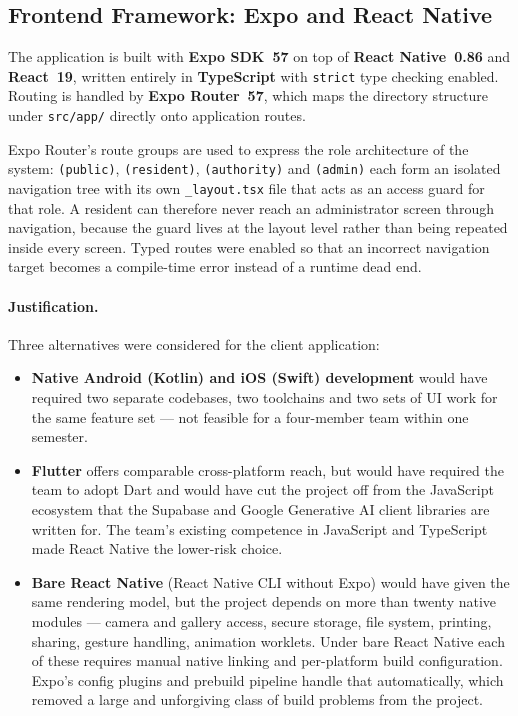 \documentclass[11pt,a4paper]{article}
\newcommand{\code}[1]{\texttt{\small #1}}
\begin{document}
\subsection{Frontend Framework: Expo and React Native}

The application is built with \textbf{Expo SDK~57} on top of
\textbf{React Native~0.86} and \textbf{React~19}, written entirely in
\textbf{TypeScript} with \code{strict} type checking enabled. Routing is handled
by \textbf{Expo Router~57}, which maps the directory structure under
\code{src/app/} directly onto application routes.

Expo Router's route groups are used to express the role architecture of the
system: \code{(public)}, \code{(resident)}, \code{(authority)} and \code{(admin)}
each form an isolated navigation tree with its own \code{\_layout.tsx} file that
acts as an access guard for that role. A resident can therefore never reach an
administrator screen through navigation, because the guard lives at the layout
level rather than being repeated inside every screen. Typed routes were enabled
so that an incorrect navigation target becomes a compile-time error instead of a
runtime dead end.

\paragraph{Justification.} Three alternatives were considered for the client
application:

\begin{itemize}[leftmargin=1.4em,itemsep=0.35em]
  \item \textbf{Native Android (Kotlin) and iOS (Swift) development} would have
        required two separate codebases, two toolchains and two sets of UI work
        for the same feature set --- not feasible for a four-member team within
        one semester.
  \item \textbf{Flutter} offers comparable cross-platform reach, but would have
        required the team to adopt Dart and would have cut the project off from
        the JavaScript ecosystem that the Supabase and Google Generative AI
        client libraries are written for. The team's existing competence in
        JavaScript and TypeScript made React Native the lower-risk choice.
  \item \textbf{Bare React Native} (React Native CLI without Expo) would have
        given the same rendering model, but the project depends on more than
        twenty native modules --- camera and gallery access, secure storage, file
        system, printing, sharing, gesture handling, animation worklets. Under
        bare React Native each of these requires manual native linking and
        per-platform build configuration. Expo's config plugins and prebuild
        pipeline handle that automatically, which removed a large and unforgiving
        class of build problems from the project.
\end{itemize}
\end{document}
